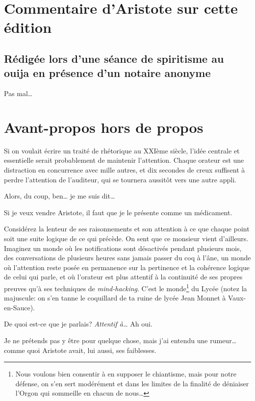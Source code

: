 
\tableofcontents

\newpage

\section*{Commentaire d'Aristote sur cette édition}
\subsection*{Rédigée lors d'une séance de spiritisme au ouija en présence d'un notaire anonyme}

Pas mal\dots{}

\newpage

\section*{Avant-propos hors de propos}

Si on voulait écrire un traité de rhétorique au XXIème siècle, l'idée centrale et essentielle serait
probablement de maintenir l'attention. Chaque orateur est une distraction en concurrence avec mille
autres, et dix secondes de creux suffisent à perdre l'attention de l'auditeur, qui se tournera aussitôt
vers une autre appli. 

Alors, du coup, ben\dots{} je me suis dit\dots{}

Si je veux vendre Aristote, il faut que je le présente comme un médicament. 

Considérez la lenteur de ses raisonnements et son attention à ce que chaque point soit une suite logique
de ce qui précède. On sent que ce monsieur vient d'ailleurs. Imaginez un monde où les notifications sont
désactivés pendant plusieurs mois, des conversations de plusieurs heures sans jamais passer du coq à l’âne,
un monde où l'attention reste posée en permanence sur la pertinence et la cohérence logique de celui qui
parle, et où l'orateur est plus attentif à la continuité de ses propres preuves qu'à ses techniques de
\emph{mind-hacking}. C'est le monde\footnote{Nous voulons bien consentir à en supposer le chiantisme, mais
pour notre défense, on s'en sert modérément et dans les limites de la finalité de déniaiser l'Orgon qui
sommeille en chacun de nous\dots{}} du Lycée (notez la majuscule: on s'en tanne le coquillard de ta ruine
de lycée Jean Monnet à Vaux-en-Sauce).

De quoi est-ce que je parlais? \emph{Attentif à\dots} Ah oui.

Je ne prétends pas y être pour quelque chose, mais j'ai entendu une rumeur\dots{} comme quoi Aristote avait,
lui aussi, ses faiblesses.

